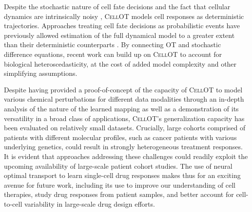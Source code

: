  Despite the stochastic nature of cell fate decisions and the fact that cellular dynamics are intrinsically noisy \citep{wilkinson2009stochastic}, \textsc{CellOT} models cell responses as deterministic trajectories. Approaches treating cell fate decisions as probabilistic events have previously allowed estimation of the full dynamical model to a greater extent than their deterministic counterparts \citep{bergen2020generalizing}.
By connecting OT and stochastic difference equations, recent work \citep{bunne2022recovering, somnath2023aligned} can build up on \textsc{CellOT} to account for biological heteroscedasticity,
at the cost of added model complexity and other simplifying assumptions.

\smallskip

Despite having provided a proof-of-concept of the capacity of \textsc{CellOT} to model various chemical perturbations for different data modalities through an in-depth analysis of the nature of the learned mapping as well as a demonstration of its versatility in a broad class of applications, \textsc{CellOT}'s generalization capacity has been evaluated on relatively small datasets. Crucially, large cohorts comprised of patients with different molecular profiles, such as cancer patients with various underlying genetics, could result in strongly heterogeneous treatment responses.
It is evident that approaches addressing these challenges could readily exploit the upcoming availability of large-scale patient cohort studies.
The use of neural optimal transport to learn single-cell drug responses makes thus for an exciting avenue for future work,
including its use to improve our understanding of cell therapies, study drug responses from patient samples, and better account for cell-to-cell variability in large-scale drug design efforts.


